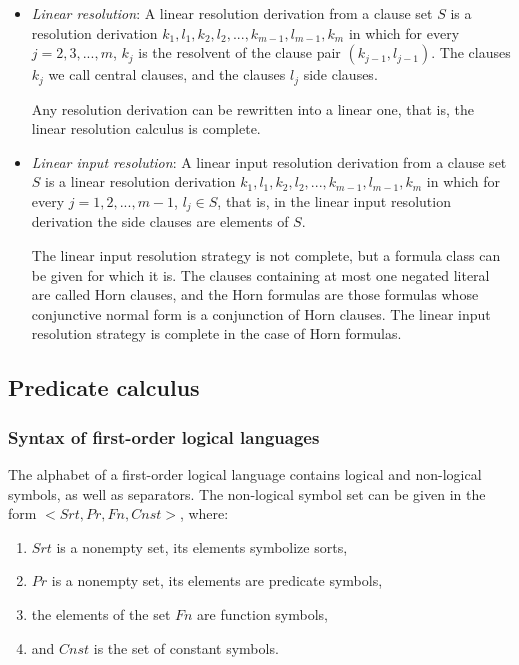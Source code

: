 \documentclass[margin=0px]{article}
\begin{document}
\begin{itemize}
    \item	\textit{Linear resolution}: A linear resolution derivation from a clause set $S$ is a
          resolution derivation $k_{1},l_{1},k_{2},l_{2}, ..., k_{m-1},l_{m-1}, k_{m}$ in which for every
          $j = 2, 3, ..., m$, $k_{j}$ is the resolvent of the clause pair $(k_{j-1},l_{j-1})$. The clauses $k_{j}$ we call central
          clauses, and the clauses $l_{j}$ side clauses.

          Any resolution derivation can be rewritten into a linear one, that is, the linear resolution calculus is complete.

    \item	\textit{Linear input resolution}: A linear input resolution derivation from a clause set $S$
          is a linear resolution derivation $k_{1},l_{1},k_{2},l_{2}, ..., k_{m-1},l_{m-1}, k_{m}$ in which for every
          $j = 1, 2, ..., m-1$, $l_{j} \in S$, that is, in the linear input resolution derivation the side clauses are elements of $S$.

          The linear input resolution strategy is not complete, but a formula class can be given for which it is. The clauses containing at most one
          negated literal are called Horn clauses, and the Horn formulas are those formulas whose
          conjunctive normal form is a conjunction of Horn clauses. The linear input resolution strategy is complete in the case of Horn formulas.
\end{itemize}

\subsection{Predicate calculus}

\subsubsection{Syntax of first-order logical languages}

The alphabet of a first-order logical language contains logical and non-logical symbols, as well as separators.
The non-logical symbol set can be given in the form $<Srt, Pr, Fn, Cnst>$, where:

\begin{enumerate}
    \item	$Srt$ is a nonempty set, its elements symbolize sorts,

    \item	$Pr$ is a nonempty set, its elements are predicate symbols,

    \item	the elements of the set $Fn$ are function symbols,

    \item	and $Cnst$ is the set of constant symbols.
\end{enumerate}
\end{document}
